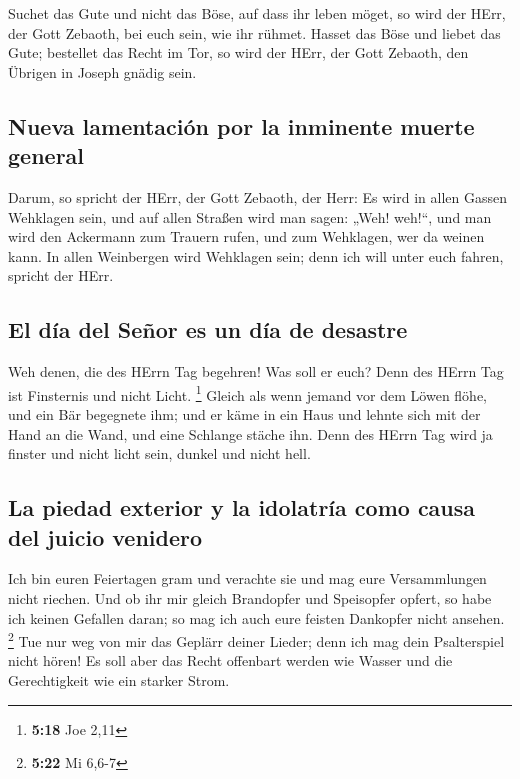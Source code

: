  Suchet das Gute und nicht das Böse, auf dass ihr leben
möget, so wird der HErr, der Gott Zebaoth, bei euch sein, wie ihr
rühmet.  Hasset das Böse und liebet das Gute; bestellet
das Recht im Tor, so wird der HErr, der Gott Zebaoth, den Übrigen in
Joseph gnädig sein.

\hypertarget{nueva-lamentaciuxf3n-por-la-inminente-muerte-general}{%
\subsection{Nueva lamentación por la inminente muerte
general}\label{nueva-lamentaciuxf3n-por-la-inminente-muerte-general}}

 Darum, so spricht der HErr, der Gott Zebaoth, der Herr:
Es wird in allen Gassen Wehklagen sein, und auf allen Straßen wird man
sagen: „Weh! weh!{}``, und man wird den Ackermann zum Trauern rufen, und
zum Wehklagen, wer da weinen kann.  In allen Weinbergen
wird Wehklagen sein; denn ich will unter euch fahren, spricht der HErr.

\hypertarget{el-duxeda-del-seuxf1or-es-un-duxeda-de-desastre}{%
\subsection{El día del Señor es un día de
desastre}\label{el-duxeda-del-seuxf1or-es-un-duxeda-de-desastre}}

 Weh denen, die des HErrn Tag begehren! Was soll er euch?
Denn des HErrn Tag ist Finsternis und nicht Licht. \footnote{\textbf{5:18}
  Joe 2,11}  Gleich als wenn jemand vor dem Löwen flöhe,
und ein Bär begegnete ihm; und er käme in ein Haus und lehnte sich mit
der Hand an die Wand, und eine Schlange stäche ihn.  Denn
des HErrn Tag wird ja finster und nicht licht sein, dunkel und nicht
hell.

\hypertarget{la-piedad-exterior-y-la-idolatruxeda-como-causa-del-juicio-venidero}{%
\subsection{La piedad exterior y la idolatría como causa del juicio
venidero}\label{la-piedad-exterior-y-la-idolatruxeda-como-causa-del-juicio-venidero}}

 Ich bin euren Feiertagen gram und verachte sie und mag
eure Versammlungen nicht riechen.  Und ob ihr mir gleich
Brandopfer und Speisopfer opfert, so habe ich keinen Gefallen daran; so
mag ich auch eure feisten Dankopfer nicht ansehen. \footnote{\textbf{5:22}
  Mi 6,6-7}  Tue nur weg von mir das Geplärr deiner
Lieder; denn ich mag dein Psalterspiel nicht hören!  Es
soll aber das Recht offenbart werden wie Wasser und die Gerechtigkeit
wie ein starker Strom.

